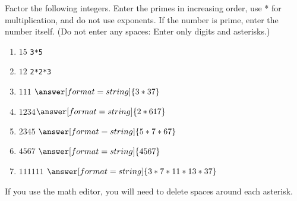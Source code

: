 \documentclass[nooutcomes]{ximera}
\begin{document}


%



\begin{problem}
Factor the following integers.  Enter the primes in increasing order, use * for multiplication, and do not use exponents.  If the number is prime, enter the number itself.  (Do not enter any spaces: Enter only digits and asterisks.)
\begin{enumerate}
\item $15$ \qquad \texttt{3*5}
\item $12$ \qquad \texttt{2*2*3}
\item $111$ \qquad    $\answer[format=string]{3*37}$
\item $1234$\qquad  $\answer[format=string]{2*617}$
\item $2345$ \qquad $\answer[format=string]{5*7*67}$
\item $4567$  \qquad $\answer[format=string]{4567}$
\item $111111$ \qquad $\answer[format=string]{3*7*11*13*37}$
\end{enumerate}
\begin{hint}
If you use the math editor, you will need to delete spaces around each asterisk. 
\end{hint}
\end{problem}
\end{document}
